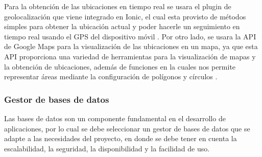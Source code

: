 Para la obtención de las ubicaciones en tiempo real se usara el plugin de geolocalización que viene integrado en Ionic, el cual esta provisto de métodos simples para obtener la ubicación actual y poder hacerle un seguimiento en tiempo real usando el GPS del dispositivo móvil \cite{ionic_geolocation}.
\bigbreak
Por otro lado, se usara la API de Google Maps para la visualización de las ubicaciones en un mapa, ya que esta API proporciona una variedad de herramientas para la visualización de mapas y la obtención de ubicaciones, además de funciones en la cuales nos permite representar áreas mediante la configuración de polígonos y círculos \cite{poligons}.


\subsubsection{Gestor de bases de datos}

Las bases de datos son un componente fundamental en el desarrollo de aplicaciones, por lo cual se debe seleccionar un gestor de bases de datos que se adapte a las necesidades del proyecto, en donde se debe tener en cuenta la escalabilidad, la seguridad, la disponibilidad y la facilidad de uso.

